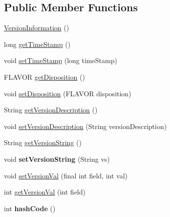 \subsection*{Public Member Functions}
\begin{DoxyCompactItemize}
\item 
\hyperlink{classgov_1_1fnal_1_1ppd_1_1dd_1_1util_1_1version_1_1VersionInformation_af4471912cacd2bbb1ff3eecc148b824e}{Version\-Information} ()
\item 
long \hyperlink{classgov_1_1fnal_1_1ppd_1_1dd_1_1util_1_1version_1_1VersionInformation_ae9f86a54a3298654a55c8c1e771bce6a}{get\-Time\-Stamp} ()
\item 
void \hyperlink{classgov_1_1fnal_1_1ppd_1_1dd_1_1util_1_1version_1_1VersionInformation_a5564d38346f3a936840c82318e1cdc2e}{set\-Time\-Stamp} (long time\-Stamp)
\item 
F\-L\-A\-V\-O\-R \hyperlink{classgov_1_1fnal_1_1ppd_1_1dd_1_1util_1_1version_1_1VersionInformation_aec69aa2f69f6df902fb9da5e45b9a146}{get\-Disposition} ()
\item 
void \hyperlink{classgov_1_1fnal_1_1ppd_1_1dd_1_1util_1_1version_1_1VersionInformation_a1e3cec92f0dbdd71120e000e6787750e}{set\-Disposition} (F\-L\-A\-V\-O\-R disposition)
\item 
String \hyperlink{classgov_1_1fnal_1_1ppd_1_1dd_1_1util_1_1version_1_1VersionInformation_ac549f15230289e67d0aa6346265bd0f3}{get\-Version\-Description} ()
\item 
void \hyperlink{classgov_1_1fnal_1_1ppd_1_1dd_1_1util_1_1version_1_1VersionInformation_aa2815f5f73561ad56a803674fa70c87b}{set\-Version\-Description} (String version\-Description)
\item 
String \hyperlink{classgov_1_1fnal_1_1ppd_1_1dd_1_1util_1_1version_1_1VersionInformation_a2f986225367b6c4b22085cd2e193af86}{get\-Version\-String} ()
\item 
\hypertarget{classgov_1_1fnal_1_1ppd_1_1dd_1_1util_1_1version_1_1VersionInformation_a989971bf610d2063f265417fbd65c6ed}{void {\bfseries set\-Version\-String} (String vs)}\label{classgov_1_1fnal_1_1ppd_1_1dd_1_1util_1_1version_1_1VersionInformation_a989971bf610d2063f265417fbd65c6ed}

\item 
void \hyperlink{classgov_1_1fnal_1_1ppd_1_1dd_1_1util_1_1version_1_1VersionInformation_a6481bf957491a248df4420de2e0dbf94}{set\-Version\-Val} (final int field, int val)
\item 
int \hyperlink{classgov_1_1fnal_1_1ppd_1_1dd_1_1util_1_1version_1_1VersionInformation_adfcdb07f96bb338c4362c059a4876f0e}{get\-Version\-Val} (int field)
\item 
\hypertarget{classgov_1_1fnal_1_1ppd_1_1dd_1_1util_1_1version_1_1VersionInformation_a8c0fa24131825cf91b4af5a31054668b}{int {\bfseries hash\-Code} ()}\label{classgov_1_1fnal_1_1ppd_1_1dd_1_1util_1_1version_1_1VersionInformation_a8c0fa24131825cf91b4af5a31054668b}


\end{DoxyCompactItemize}
